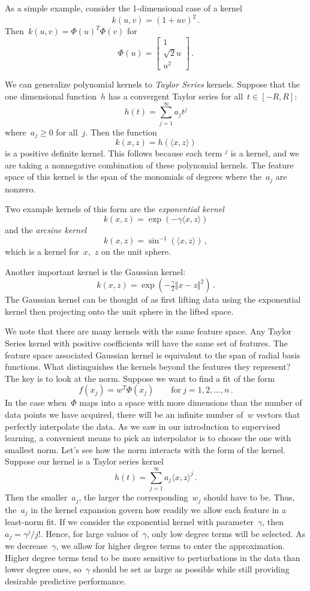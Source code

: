 \documentclass{tufte-book}
\begin{document}
As a simple example, consider the 1-dimensional case of a kernel \[
    k(u,v) = (1+uv)^2\,.
\] Then~\(k(u,v) =\Phi(u)^T \Phi(v)\) for \[
\Phi(u) = \begin{bmatrix} 1\\ \sqrt{2} u \\ u^2
\end{bmatrix}\,.
\]

We can generalize polynomial kernels to \emph{Taylor Series} kernels.
Suppose that the one dimensional function~\(h\) has a convergent Taylor
series for all~\(t \in [-R,R]\): \[
    h(t) = \sum_{j=1}^\infty a_j t^j
\] where~\(a_j \geq 0\) for all~\(j\). Then the function \[
    k(x,z) = h(\langle x, z \rangle)
\] is a positive definite kernel. This follows because each term
\(<x,z>^j\) is a kernel, and we are taking a nonnegative combination of
these polynomial kernels. The feature space of this kernel is the span
of the monomials of degrees where the~\(a_j\) are nonzero.

Two example kernels of this form are the \emph{exponential kernel} \[
    k(x,z) = \exp(-\gamma \langle x, z\rangle)
\] and the \emph{arcsine kernel} \[
    k(x,z) = \sin^{-1}(\langle x,z \rangle)\,,
\] which is a kernel for~\(x\),~\(z\) on the unit sphere.

Another important kernel is the Gaussian kernel: \[
    k(x,z) = \exp(-\tfrac{\gamma}{2} \Vert x-z\Vert^2)\,.
\] The Gaussian kernel can be thought of as first lifting data using the
exponential kernel then projecting onto the unit sphere in the lifted
space.

We note that there are many kernels with the same feature space. Any
Taylor Series kernel with positive coefficients will have the same set
of features. The feature space associated Gaussian kernel is equivalent
to the span of radial basis functions. What distinguishes the kernels
beyond the features they represent? The key is to look at the norm.
Suppose we want to find a fit of the form \[
    f(x_j) = w^T \Phi(x_j)\qquad \text{for}~j=1,2,\ldots,n\,.
\] In the case when~\(\Phi\) maps into a space with more dimensions than
the number of data points we have acquired, there will be an infinite
number of~\(w\) vectors that perfectly interpolate the data. As we saw
in our introduction to supervised learning, a convenient means to pick
an interpolator is to choose the one with smallest norm. Let's see how
the norm interacts with the form of the kernel. Suppose our kernel is a
Taylor series kernel \[
    h(t) = \sum_{j=1}^\infty a_j \langle x, z \rangle^j\,.
\] Then the smaller~\(a_j\), the larger the corresponding~\(w_j\) should
have to be. Thus, the~\(a_j\) in the kernel expansion govern how readily
we allow each feature in a least-norm fit. If we consider the
exponential kernel with parameter~\(\gamma\),
then~\(a_j = \gamma^j/j!\). Hence, for large values of~\(\gamma\), only
low degree terms will be selected. As we decrease~\(\gamma\), we allow
for higher degree terms to enter the approximation. Higher degree terms
tend to be more sensitive to perturbations in the data than lower degree
ones, so~\(\gamma\) should be set as large as possible while still
providing desirable predictive performance.
\end{document}

